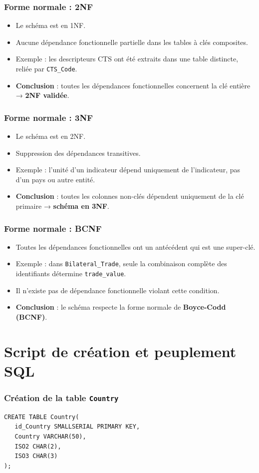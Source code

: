 \documentclass[11pt]{beamer}
\begin{document}
\begin{frame}
  \frametitle{Forme normale : 2NF}
  \begin{itemize}
    \item Le schéma est en 1NF.
    \item Aucune dépendance fonctionnelle partielle dans les tables à clés composites.
    \item Exemple : les descripteurs CTS ont été extraits dans une table distincte, reliée par \texttt{CTS\_Code}.
    \item \textbf{Conclusion} : toutes les dépendances fonctionnelles concernent la clé entière → \textbf{2NF validée}.
  \end{itemize}
\end{frame}

\begin{frame}
  \frametitle{Forme normale : 3NF}
  \begin{itemize}
    \item Le schéma est en 2NF.
    \item Suppression des dépendances transitives.
    \item Exemple : l’unité d’un indicateur dépend uniquement de l’indicateur, pas d’un pays ou autre entité.
    \item \textbf{Conclusion} : toutes les colonnes non-clés dépendent uniquement de la clé primaire → \textbf{schéma en 3NF}.
  \end{itemize}
\end{frame}

\begin{frame}
  \frametitle{Forme normale : BCNF}
  \begin{itemize}
    \item Toutes les dépendances fonctionnelles ont un antécédent qui est une super-clé.
    \item Exemple : dans \texttt{Bilateral\_Trade}, seule la combinaison complète des identifiants détermine \texttt{trade\_value}.
    \item Il n'existe pas de dépendance fonctionnelle violant cette condition.
    \item \textbf{Conclusion} : le schéma respecte la forme normale de \textbf{Boyce-Codd (BCNF)}.
  \end{itemize}
\end{frame}


\section{Script de création et peuplement SQL}
\begin{frame}[fragile]
  \frametitle{Création de la table \texttt{Country}}
\begin{verbatim}
CREATE TABLE Country(
   id_Country SMALLSERIAL PRIMARY KEY,
   Country VARCHAR(50),
   ISO2 CHAR(2),
   ISO3 CHAR(3)
);
\end{verbatim}
\end{frame}
\end{document}
